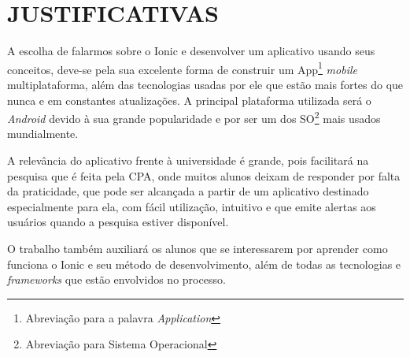 \chapter{JUSTIFICATIVAS}

	\par A escolha de falarmos sobre o Ionic e desenvolver um aplicativo usando seus conceitos, deve-se pela sua excelente forma de construir um App\footnote{Abreviação para a palavra \textit{Application}} \textit{mobile} multiplataforma, além das tecnologias usadas por ele que estão mais fortes do que nunca e em constantes atualizações. A principal plataforma utilizada será o \textit{Android} devido à sua grande popularidade e por ser um dos SO\footnote{Abreviação para Sistema Operacional} mais usados mundialmente.
	
	\par A relevância do aplicativo frente à universidade é grande, pois facilitará na pesquisa que é feita pela CPA, onde muitos alunos deixam de responder por falta da praticidade, que pode ser alcançada a partir de um aplicativo destinado especialmente para ela, com fácil utilização, intuitivo e que emite alertas aos usuários quando a pesquisa estiver disponível.
	
	\par O trabalho também auxiliará os alunos que se interessarem por aprender como funciona o Ionic e seu método de desenvolvimento, além de todas as tecnologias e \textit{frameworks} que estão envolvidos no processo.
	